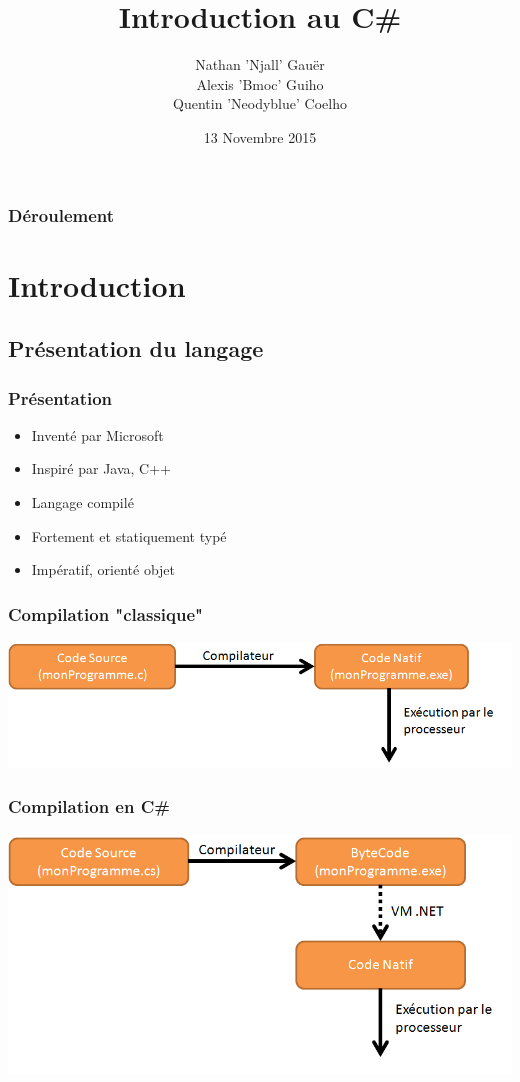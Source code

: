 \documentclass{beamer}
\title[Introduction au C\#]{Introduction au C\#}
\author[]{
Nathan 'Njall' Gauër\\
Alexis 'Bmoc' Guiho\\
Quentin 'Neodyblue' Coelho
}
\institute[GConfs]
{
GConfs
\medskip
}
\date{13 Novembre 2015}
\begin{document}
\begin{frame}
\titlepage
\end{frame}

\begin{frame}
\frametitle{Déroulement}
\tableofcontents
\end{frame}

\section{Introduction}

\subsection{Présentation du langage}

\begin{frame}
\frametitle{Présentation}
\begin{itemize}
\item Inventé par Microsoft
\pause
\item Inspiré par Java, C++
\pause
\item Langage compilé
\pause
\item Fortement et statiquement typé
\pause
\item Impératif, orienté objet
\end{itemize}
\end{frame}

\begin{frame}
\frametitle{Compilation "classique"}
\includegraphics[scale=0.50]{img/comp_nat.png}
\end{frame}

\begin{frame}
\frametitle{Compilation en C\#}
\includegraphics[scale=0.40]{img/comp_bc.png}
\end{frame}
\end{document}
